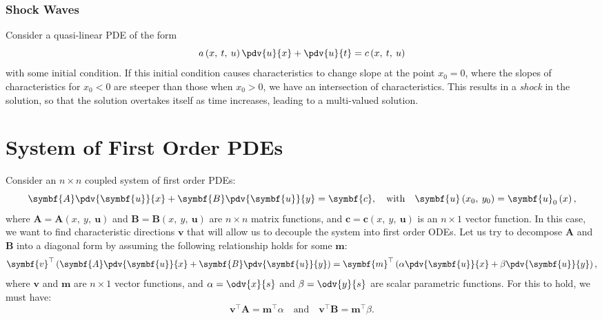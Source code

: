 \documentclass{article}
\theoremstyle{definition}
\begin{document}
\subsubsection{Shock Waves}
Consider a quasi-linear PDE of the form
\begin{equation*}
    a\left( x,\: t,\: u \right) \pdv{u}{x} + \pdv{u}{t} = c\left( x,\: t,\: u \right)
\end{equation*}
with some initial condition. If this initial condition causes
characteristics to change slope at the point \(x_0 = 0\), where the
slopes of characteristics for \(x_0 < 0\) are steeper than those when
\(x_0 > 0\), we have an intersection of characteristics.
This results in a \textit{shock} in the solution, so that the solution
overtakes itself as time increases, leading to a multi-valued solution.
\section{System of First Order PDEs}
Consider an \(n \times n\) coupled system of first order PDEs:
\begin{equation*}
    \symbf{A} \pdv{\symbf{u}}{x} + \symbf{B} \pdv{\symbf{u}}{y} = \symbf{c}, \quad \text{with} \quad \symbf{u}\left( x_0,\: y_0 \right) = \symbf{u}_0\left( x \right),
\end{equation*}
where \(\symbf{A} = \symbf{A}\left( x,\: y,\: \symbf{u} \right)\) and
\(\symbf{B} = \symbf{B}\left( x,\: y,\: \symbf{u} \right)\) are
\(n \times n\) matrix functions, and
\(\symbf{c} = \symbf{c}\left( x,\: y,\: \symbf{u} \right)\) is an
\(n \times 1\) vector function.
In this case, we want to find characteristic directions \(\symbf{v}\)
that will allow us to decouple the system into first order ODEs. Let us
try to decompose \(\symbf{A}\) and \(\symbf{B}\) into a diagonal form by
assuming the following relationship holds for some \(\symbf{m}\):
\begin{equation*}
    \symbf{v}^\top \left( \symbf{A} \pdv{\symbf{u}}{x} + \symbf{B} \pdv{\symbf{u}}{y} \right) = \symbf{m}^\top \left( \alpha \pdv{\symbf{u}}{x} + \beta \pdv{\symbf{u}}{y} \right),
\end{equation*}
where \(\symbf{v}\) and \(\symbf{m}\) are \(n \times 1\) vector
functions, and \(\alpha = \odv{x}{s}\) and \(\beta = \odv{y}{s}\) are
scalar parametric functions. For this to hold, we must have:
\begin{equation*}
    \symbf{v}^\top \symbf{A} = \symbf{m}^\top \alpha \quad \text{and} \quad \symbf{v}^\top \symbf{B} = \symbf{m}^\top \beta.
\end{equation*}
\end{document}
